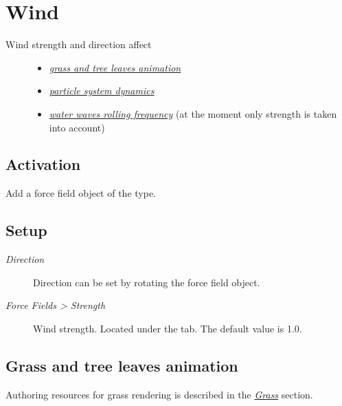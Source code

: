 \documentclass[a4paper,12pt,oneside]{sphinxmanual}
\begin{document}
\section{Wind}
\label{outdoor_rendering:id30}\label{outdoor_rendering:wind}\begin{description}
\item[{Wind strength and direction affect}] \leavevmode\begin{itemize}
\item {} 
{\hyperref[outdoor_rendering:wind-bending]{\emph{grass and tree leaves animation}}}

\item {} 
{\hyperref[particles:particles-force-fields]{\emph{particle system dynamics}}}

\item {} 
{\hyperref[outdoor_rendering:water-volumetric-waves]{\emph{water waves rolling frequency}}} (at the moment only strength is taken into account)

\end{itemize}

\end{description}


\subsection{Activation}
\label{outdoor_rendering:id31}
Add a force field object of the  type.


\subsection{Setup}
\label{outdoor_rendering:id32}\begin{description}
\item[{\emph{Direction}}] \leavevmode
Direction can be set by rotating the force field object.

\item[{\emph{Force Fields \textgreater{} Strength}}] \leavevmode
Wind strength. Located under the  tab. The default value is 1.0.

\end{description}


\subsection{Grass and tree leaves animation}
\label{outdoor_rendering:wind-bending}\label{outdoor_rendering:id33}
Authoring resources for grass rendering is described in the {\hyperref[particles_instancing:particles-grass]{\emph{Grass}}} section.
\end{document}
